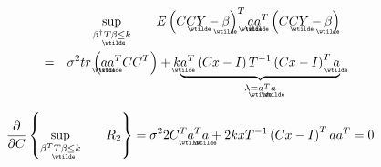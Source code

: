 \documentclass{article}
\begin{document}
\begin{eqnarray}
&&\underset{\beta ^{\dagger }T%
\underaccent{\wtilde}{\beta}%
\leq k}{\sup }\qquad E\left( CC%
\underaccent{\wtilde}{Y}%
-%
\underaccent{\wtilde}{\beta}%
\right) ^{T}%
\underaccent{\wtilde}{a}%
\underaccent{\wtilde}{a}%
^{T}\left( CC%
\underaccent{\wtilde}{Y}%
-%
\underaccent{\wtilde}{\beta}%
\right)  \notag \\
&=&\sigma ^{2}tr\left( 
\underaccent{\wtilde}{a}%
\underaccent{\wtilde}{a}%
^{T}CC^{T}\right) +k\underset{\lambda =%
\underaccent{\wtilde}{a}%
^{T}%
\underaccent{\wtilde}{a}%
}{\underbrace{%
\underaccent{\wtilde}{a}%
^{T}\left( Cx-I\right) T^{-1}\left( Cx-I\right) ^{T}%
\underaccent{\wtilde}{a}%
}}
\end{eqnarray}

\begin{equation*}
\frac{\partial }{\partial C}\left\{ \underset{\beta ^{T}T%
\underaccent{\wtilde}{\beta}%
\leq k}{\sup }\qquad R_{2}\right\} =\sigma ^{2}2C^{T}%
\underaccent{\wtilde}{a}%
^{T}%
\underaccent{\wtilde}{a}%
+2kxT^{-1}\left( Cx-I\right) ^{T}aa^{T}=0
\end{equation*}
\end{document}
